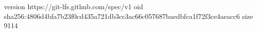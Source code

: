version https://git-lfs.github.com/spec/v1
oid sha256:4806d4bfa7b23f0cd435a721db3cc3ac66c057687baedbfca1f72f3ce4aeacc6
size 9114
